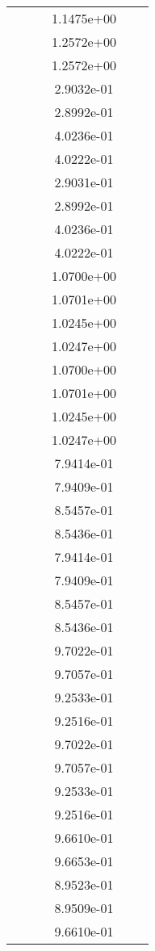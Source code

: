 \begin{xltabular}{\textwidth}{r|rS[table-format=1.3e+2]S[table-format=1.4e+2]S[table-format=1.4e+2]S[table-format=-1.5]}
&  &  & 1.1475e+00 & & \\
&  &  & 1.2572e+00 & & \\
&  &  & 1.2572e+00 & & \\
&  &  & 2.9032e-01 & & \\
&  &  & 2.8992e-01 & & \\
&  &  & 4.0236e-01 & & \\
&  &  & 4.0222e-01 & & \\
&  &  & 2.9031e-01 & & \\
&  &  & 2.8992e-01 & & \\
&  &  & 4.0236e-01 & & \\
&  &  & 4.0222e-01 & & \\
&  &  & 1.0700e+00 & & \\
&  &  & 1.0701e+00 & & \\
&  &  & 1.0245e+00 & & \\
&  &  & 1.0247e+00 & & \\
&  &  & 1.0700e+00 & & \\
&  &  & 1.0701e+00 & & \\
&  &  & 1.0245e+00 & & \\
&  &  & 1.0247e+00 & & \\
&  &  & 7.9414e-01 & & \\
&  &  & 7.9409e-01 & & \\
&  &  & 8.5457e-01 & & \\
&  &  & 8.5436e-01 & & \\
&  &  & 7.9414e-01 & & \\
&  &  & 7.9409e-01 & & \\
&  &  & 8.5457e-01 & & \\
&  &  & 8.5436e-01 & & \\
&  &  & 9.7022e-01 & & \\
&  &  & 9.7057e-01 & & \\
&  &  & 9.2533e-01 & & \\
&  &  & 9.2516e-01 & & \\
&  &  & 9.7022e-01 & & \\
&  &  & 9.7057e-01 & & \\
&  &  & 9.2533e-01 & & \\
&  &  & 9.2516e-01 & & \\
&  &  & 9.6610e-01 & & \\
&  &  & 9.6653e-01 & & \\
&  &  & 8.9523e-01 & & \\
&  &  & 8.9509e-01 & & \\
&  &  & 9.6610e-01 & & \\

\end{xltabular}
